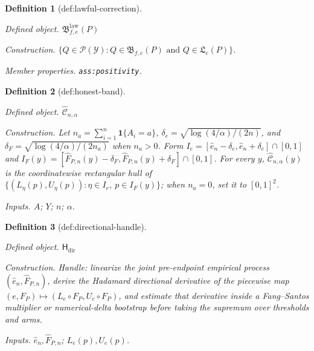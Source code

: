 \documentclass{article}
\newtheorem{definition}{Definition}
\begin{document}
\begin{definition}[def:lawful-correction]\label{def:lawful-correction}
\par\smallskip\noindent\emph{Defined object.} \(\mathfrak B^{\mathrm{law}}_{f,e}(P)\)
\par\smallskip\noindent\emph{Construction.} \(\{Q\in\mathcal P(\mathcal Y):Q\in\mathfrak B_{f,e}(P)\text{ and }Q\in\mathfrak L_e(P)\}\).
\par\smallskip\noindent\emph{Member properties.} \texttt{ass:\allowbreak{}positivity}.
\end{definition}

\begin{definition}[def:honest-band]\label{def:honest-band}
\par\smallskip\noindent\emph{Defined object.} \(\widehat{\mathcal C}_{n,\alpha}\)
\par\smallskip\noindent\emph{Construction.} Let \(n_a=\sum_{i=1}^n\mathbf 1\{A_i=a\}\), \(\delta_e=\sqrt{\log(4/\alpha)/(2n)}\), and \(\delta_F=\sqrt{\log(4/\alpha)/(2n_a)}\) when \(n_a>0\). Form \(I_e=[\widehat e_n-\delta_e,\widehat e_n+\delta_e]\cap[0,1]\) and \(I_F(y)=[\widehat F_{P,n}(y)-\delta_F,\widehat F_{P,n}(y)+\delta_F]\cap[0,1]\). For every \(y\), \(\widehat{\mathcal C}_{n,\alpha}(y)\) is the coordinatewise rectangular hull of \(\{(L_\eta(p),U_\eta(p)):\eta\in I_e,\ p\in I_F(y)\}\); when \(n_a=0\), set it to \([0,1]^2\).
\par\smallskip\noindent\emph{Inputs.} \(A\); \(Y\); \(n\); \(\alpha\).
\end{definition}

\begin{definition}[def:directional-handle]\label{def:directional-handle}
\par\smallskip\noindent\emph{Defined object.} \(\mathsf H_{\mathrm{dir}}\)
\par\smallskip\noindent\emph{Construction.} Handle: linearize the joint pre-endpoint empirical process \((\widehat e_n,\widehat F_{P,n})\), derive the Hadamard directional derivative of the piecewise map \((e,F_P)\mapsto(L_e\circ F_P,U_e\circ F_P)\), and estimate that derivative inside a Fang--Santos multiplier or numerical-delta bootstrap before taking the supremum over thresholds and arms.
\par\smallskip\noindent\emph{Inputs.} \(\widehat e_n,\widehat F_{P,n}\); \(L_e(p),U_e(p)\).
\end{definition}
\end{document}
